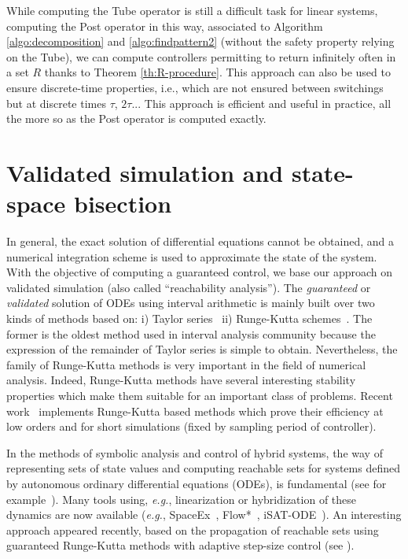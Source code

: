 While computing the Tube operator is still a difficult task for linear systems,
computing the Post operator in this way, 
associated to Algorithm \ref{algo:decomposition} and \ref{algo:findpattern2} (without the 
safety property relying on the Tube), we can compute 
controllers permitting to return infinitely often in a set $R$ thanks to
Theorem \ref{th:R-procedure}. 
This approach can also be used to ensure discrete-time properties, i.e., 
which are not ensured between switchings but at discrete times $\tau$, $2\tau$...
This approach is efficient and useful in practice, all the more so as
the Post operator is computed exactly.








\section{Validated simulation and state-space bisection}



In general, the exact solution of differential equations cannot be
obtained, and a numerical integration scheme is used to approximate
the state of the system.  With the objective of computing a guaranteed
control, we base our approach on validated simulation (also called
``reachability analysis''). The \emph{guaranteed} or \emph{validated}
solution of ODEs using interval arithmetic is mainly built over two
kinds of methods based on: i) Taylor
series~\cite{Moore66,Nedialkov,LiSt07,Dzetkulic:2015fk} ii)
Runge-Kutta schemes~\cite{BM06,Gajda:2008fk,BCD13,report}. The former
is the oldest method used in interval analysis community because the
expression of the remainder of Taylor series is simple to obtain.
Nevertheless, the family of Runge-Kutta methods is very important in
the field of numerical analysis.  Indeed, Runge-Kutta methods have
several interesting stability properties which make them suitable for
an important class of problems. Recent work~\cite{dynibex} implements
Runge-Kutta based methods which prove their efficiency at low orders
and for short simulations (fixed by sampling period of controller).

In the methods of symbolic analysis and control of hybrid systems, the
way of representing sets of state values and computing reachable sets
for systems defined by autonomous ordinary differential equations
(ODEs), is fundamental (see for
example~\cite{girard2005reachability,althoff2013reachability}). Many
tools using, \textit{e.g.}, linearization or hybridization of these
dynamics are now available (\textit{e.g.},
SpaceEx~\cite{frehse2011spaceex}, Flow*~\cite{chen2013flow},
iSAT-ODE~\cite{eggers2008sat}).  An interesting approach appeared
recently, based on the propagation of reachable sets using guaranteed
Runge-Kutta methods with adaptive step-size control (see
\cite{BCD13,immler2015verified}).

